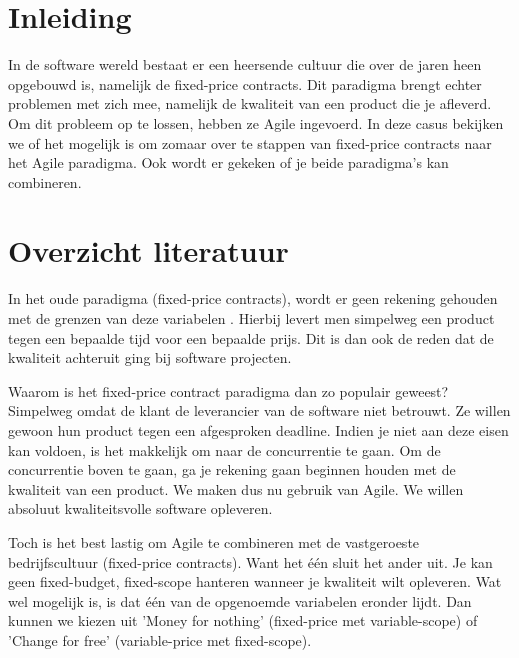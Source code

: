 \documentclass{hogent-article}
\affiliation{
	\textsuperscript{1}\href{indy.vancanegem@student.hogent.be}
}
\affiliation{
	\textsuperscript{2}\href{mout.pessemier@student.hogent.be}
}
\affiliation{
	\textsuperscript{3}\href{nante.vermeulen@student.hogent.be}
}
\affiliation{
	\textsuperscript{4}\href{jef.malfliet@student.hogent.be}
}
\begin{document}
	
\flushbottom
\maketitle
\tableofcontents 
\thispagestyle{empty} %
	
	\section{Inleiding}
	
	In de software wereld bestaat er een heersende cultuur die over de jaren heen opgebouwd is, namelijk de fixed-price contracts. Dit paradigma brengt echter problemen met zich mee, namelijk de kwaliteit van een product die je afleverd. Om dit probleem op te lossen, hebben ze Agile ingevoerd. In deze casus bekijken we of het mogelijk is om zomaar over te stappen van fixed-price contracts naar het Agile paradigma. Ook wordt er gekeken of je beide paradigma's kan combineren. 
	
	\section{Overzicht literatuur}
	
	In het oude paradigma (fixed-price contracts), wordt er geen
	rekening gehouden met de grenzen van deze variabelen 	\autocite{Scrumology2012}. Hierbij levert men simpelweg een product tegen een bepaalde
	tijd voor een bepaalde prijs. Dit is dan ook de reden dat de kwaliteit achteruit ging bij software projecten. 
	
	Waarom is het fixed-price contract paradigma dan zo populair geweest? 
	Simpelweg omdat de klant de leverancier van de software niet betrouwt. Ze willen gewoon hun product tegen een 
	afgesproken deadline. Indien je niet aan deze eisen kan voldoen, is het makkelijk om naar de concurrentie te gaan. 
	Om de concurrentie boven te gaan, ga je rekening gaan beginnen houden met de kwaliteit van een product. We maken
	dus nu gebruik van Agile. We willen absoluut kwaliteitsvolle software opleveren. 
	
	Toch is het best lastig om Agile te combineren met de vastgeroeste bedrijfscultuur (fixed-price contracts). Want
	het één sluit het ander uit. Je kan geen fixed-budget, fixed-scope hanteren wanneer je kwaliteit wilt opleveren. 
	Wat wel mogelijk is, is dat één van de opgenoemde variabelen eronder lijdt. Dan kunnen we kiezen uit 
	'Money for nothing' (fixed-price met variable-scope) of 'Change for free' (variable-price met fixed-scope). 
	
\end{document}
